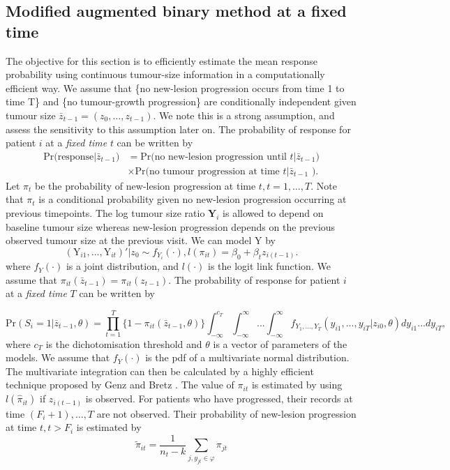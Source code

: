 \documentclass[10pt,A4]{article}
\begin{document}
\subsection{Modified augmented binary method at a fixed time}\label{mAugbinfix}
The objective for this section is to efficiently estimate the mean response probability using continuous tumour-size information in a computationally efficient way. We assume that \{no new-lesion progression occurs from time 1 to time T\} and  \{no tumour-growth progression\} are conditionally independent given tumour size $\bar{z}_{t-1}=(z_0,\ldots,z_{t-1})$. We note this is a strong assumption, and assess the sensitivity to this assumption later on. The probability of response for patient $i$ at a \textit{fixed time} $t$ can be written by
\[
\begin{array}{cl}
\text{Pr(response$|\bar{z}_{t-1}$)} & = \text{Pr(no new-lesion progression until $t| \bar{z}_{t-1}$)} \\
& \times \text{Pr(no tumour progression at time $t | \bar{z}_{t-1}$ )}.
\end{array}
\]
Let $\pi_{t}$ be the probability of new-lesion progression at time $t, t=1, \dots, T$. Note that $\pi_t$ is a conditional probability given no new-lesion progression occurring at previous timepoints. The log tumour size ratio $\mathbf{Y}_i$ is allowed to depend on baseline tumour size whereas new-lesion progression depends on the previous observed tumour size at the previous visit. We can model Y by
\begin{equation}
(\text{Y}_{i1}, \dots, \text{Y}_{it})'|z_0 \sim f_{Y_i}(\cdot), l(\pi_{it})=\beta_0+\beta_t z_{i(t-1)}.
\end{equation}
where $f_Y(\cdot)$ is a joint distribution, and $l(\cdot)$ is the logit link function. We assume that $\pi_{it}(\bar{z}_{t-1})=\pi_{it}(z_{t-1})$. The probability of response for patient $i$ at a \textit{fixed time} $T$ can be written by

\begin{equation}
\text{Pr}(S_{i}=1|\bar{z}_{t-1}, \theta)=\prod_{t=1}^{T} \{1-\pi_{it}(\bar{z}_{t-1},\theta)\} \int_{-\infty}^{c_T}\int_{-\infty}^{\infty} ... \int_{-\infty}^{\infty} f_{Y_1,...,Y_T}(y_{i1},...,y_{iT}|z_{i0}, \theta)dy_{i1}...dy_{iT},
\label{eqfix}
\end{equation}
where $c_T$ is the dichotomisation threshold and $\theta$ is a vector of parameters of the models. We assume that $f_Y(\cdot)$ is the pdf of a multivariate normal distribution. The multivariate integration can then be calculated by a highly efficient technique proposed by Genz and Bretz \cite{Genz2009}. The value of $\pi_{it}$ is estimated by using $l(\hat{\pi}_{it})$ if $z_{i (t-1)}$ is observed. For patients who have progressed, their records at time $(F_i+1),\ldots, T$ are not observed. Their probability of new-lesion progression at time $t, t> F_i$ is estimated by
\begin{equation}
\tilde{\pi}_{it}=\frac{1}{n_t-k}\sum \limits_{j,y_{jt} \in \varphi}{}\pi_{jt}
\label{eqpi2}
\end{equation}
\end{document}
